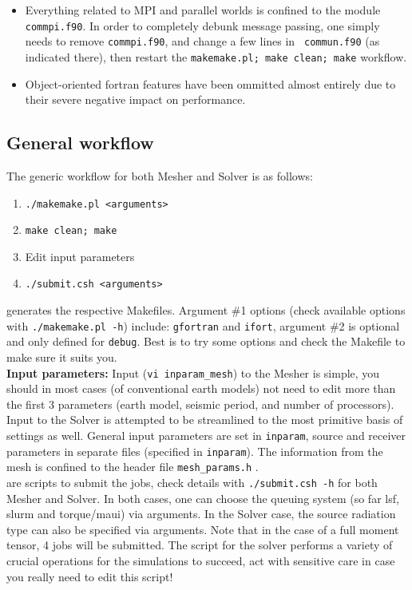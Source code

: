 \documentclass[11pt,letter,fleqn,english,notitlepage]{article}
\begin{document}
\begin{itemize}
    \item Everything related to MPI and parallel worlds is confined to the
    module {\tt commpi.f90}. In order to completely debunk message passing, one
    simply needs to remove {\tt commpi.f90}, and change a few lines in {\tt
    commun.f90} (as indicated there), then restart the {\tt makemake.pl; make
    clean; make} workflow. 

    \item Object-oriented fortran features have been ommitted almost entirely
    due to their severe negative impact on performance.
\end{itemize}

\subsection{General workflow}
The generic workflow for both Mesher and Solver is as follows:
\begin{enumerate}
    \item {\tt ./makemake.pl <arguments>}
    \item {\tt make clean; make}
    \item Edit input parameters
    \item {\tt ./submit.csh <arguments>}
\end{enumerate}

 generates the respective Makefiles. Argument \#1 options 
(check available options with {\tt ./makemake.pl -h}) include:
{\tt gfortran} and {\tt ifort}, argument \#2 is optional and only defined for
{\tt debug}. Best is to try some options and check the Makefile to make sure it suits you.\\

\noindent \textbf{Input parameters: } Input ({\tt vi inparam\_mesh})
to the Mesher is simple, you should in most cases (of conventional earth models) 
not need to edit more than the first 3 parameters (earth model, seismic period, and number of processors). 
Input to the Solver is attempted to be streamlined to the most primitive basis of settings as well. General 
input parameters are set in {\tt inparam}, source and receiver parameters in separate files (specified 
in {\tt inparam}). The information from the mesh is confined to the header file {\tt mesh\_params.h} .\\

 are scripts to submit the jobs, check details with
{\tt ./submit.csh -h} for both Mesher and Solver. In both cases, one can
choose the queuing system (so far lsf, slurm and torque/maui) via arguments. In the
Solver case, the source radiation type can also be specified via arguments.
Note that in the case of a full moment tensor, 4 jobs will be submitted.
The script for the solver performs a variety
of crucial operations for the simulations to succeed, act with sensitive care
in case you really need to edit this script! \\
\end{document}
